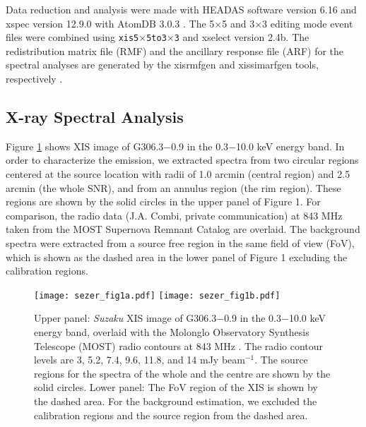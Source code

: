 \documentclass[useAMS,usenatbib]{mn2e}
\begin{document}
Data reduction and analysis were made with HEADAS software version 6.16 and {\sc xspec} version 12.9.0 \citep {Ar96} with AtomDB 3.0.3 \citep{Sm01, Fo12}. The 5$\times$5 and 3$\times$3 editing mode event files were combined using \texttt{xis5$\times$5to3$\times$3} and {\sc xselect} version 2.4b. The redistribution matrix file (RMF) and the ancillary response file (ARF) for the spectral analyses are generated by the {\sc xisrmfgen} and {\sc xissimarfgen} tools, respectively \citep {Is07}.

\subsection{X-ray Spectral Analysis} \label{Spectral analysis}
Figure \ref{figure_1} shows XIS image of G306.3$-$0.9 in the 0.3$-$10.0 keV energy band. In order to characterize the emission, we extracted spectra from two circular regions centered at the source location with radii of 1.0 arcmin (central region) and 2.5 arcmin (the whole SNR), and from an annulus region (the rim region). These regions are shown by the solid circles in the upper panel of Figure 1. For comparison, the
radio data (J.A. Combi, private communication) at 843 MHz taken from the MOST Supernova Remnant Catalog \citep {Wh96} are overlaid. The background spectra were extracted from a source free region in the same field of view (FoV), which is shown as the dashed area in the lower panel of Figure 1 excluding the calibration regions. 


\begin{figure}
\centering \vspace*{1pt}
\texttt{[image: sezer\_fig1a.pdf]}
\texttt{[image: sezer\_fig1b.pdf]}
\caption{Upper panel: {\it Suzaku} XIS image of G306.3$-$0.9 in the 0.3$-$10.0 keV energy band, overlaid with the Molonglo Observatory Synthesis Telescope (MOST) radio contours at 843 MHz \citep {Wh96}. The radio contour levels are 3, 5.2, 7.4, 9.6, 11.8, and 14 mJy beam$^{-1}$. The source regions for the spectra of the whole and the centre are shown by the solid circles. Lower panel: The FoV region of the XIS is shown by the dashed area. For the background estimation, we excluded the calibration regions and the source region from the dashed area.}
\label{figure_1}
\end{figure}

\end{document}

